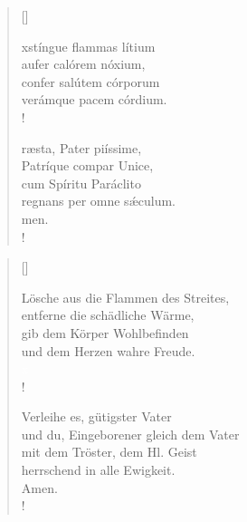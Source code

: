 {\setlength{\columnsep}{0.5cm}

\begin{multicols}{2}
\begin{verse}[\versewidth]
 

{\small{xstíngue flammas lítium\\
aufer calórem nóxium, \\
confer salútem córporum\\
verámque pacem córdium.\\!

ræsta, Pater piíssime,\\ 
Patríque compar Unice, \\
cum Spíritu Paráclito\\
regnans per omne s\'{æ}culum.\\ men.\\!}}

\end{verse}

\columnbreak
 
\begin{verse}[\versewidth]
 
{\footnotesize\rm{Lösche aus die Flammen des Streites,\\
entferne die schädliche Wärme,\\
gib dem Körper Wohlbefinden\\
und dem Herzen wahre Freude.\\
{\textcolor{white}x}\\!

	
	    
Verleihe es, gütigster Vater\\
und du, Eingeborener gleich dem Vater\\
mit dem Tröster, dem Hl. Geist\\
herrschend in alle Ewigkeit.\\ Amen.\\!}}


\end{verse} 
\end{multicols}
}

\vspace{1cm}

